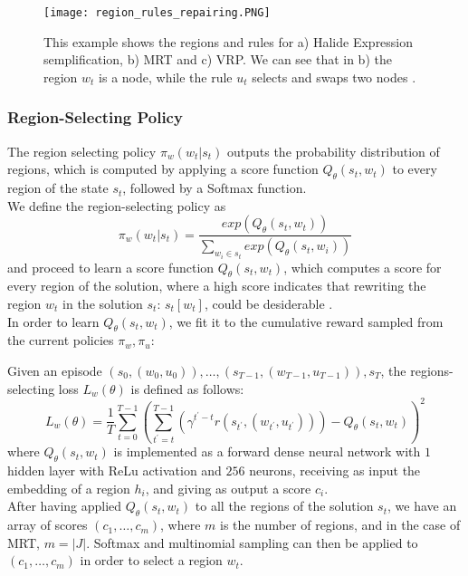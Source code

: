 \documentclass[12pt]{article}
\begin{document}
\begin{figure}[H]
    \centering
    \texttt{[image: region\_rules\_repairing.PNG]}
    \caption{This example shows the regions and rules for a) Halide Expression semplification, b) MRT and c) VRP. We can see that in b) the region $w_t$ is a node, while the rule $u_t$ selects and swaps two nodes \cite{neu_rewriter}.}
    \label{img:region_rules_repairing}
\end{figure}

\subsubsection{Region-Selecting Policy}
\label{sec:region_selecting}
The region selecting policy $\pi_{w}(w_t|s_t)$ outputs the probability distribution of regions, which is computed by applying a score function $Q_{\theta}(s_t,w_t)$ to every region of the state $s_t$, followed by a Softmax function.\\
We define the region-selecting policy as $$\pi_{w}(w_t|s_t) = \frac{exp(Q_{\theta}(s_t,w_t))}{\sum_{w_i \in s_t}exp(Q_{\theta}(s_t, w_i))}$$ and proceed to learn a score function $Q_{\theta}(s_t, w_t)$, which computes a score for every region of the solution, where a high score indicates that rewriting the region $w_t$ in the solution $s_t$: $s_t[w_t]$, could be desiderable \cite{neu_rewriter}.\\
In order to learn $Q_{\theta}(s_t, w_t)$, we fit it to the cumulative reward sampled from the current policies $\pi_w, \pi_u$:

\medbreak
Given an episode $\left(s_0,(w_0,u_0)\right),\dots, \left(s_{T-1},(w_{T-1},u_{T-1})\right), s_T$, the regions-selecting loss $L_w(\theta)$ is defined as follows:
\label{region_selecting_loss}
$$L_w(\theta) = \frac{1}{T}\sum_{t=0}^{T-1}\left(\sum_{t^{'}=t}^{T-1}\left(\gamma^{t^{'}-t}r(s_{t^{'}},(w_{t^{'}},u_{t^{'}}))\right) - Q_{\theta}(s_t,w_t)\right)^2$$
where $Q_{\theta}(s_t, w_t)$ is implemented as a forward dense neural network with $1$ hidden layer with ReLu activation and $256$ neurons, receiving as input the embedding of a region $h_i$, and giving as output a score $c_i$.\\
After having applied $Q_{\theta}(s_t, w_t)$ to all the regions of the solution $s_t$, we have an array of scores $(c_1,\dots,c_m)$, where $m$ is the number of regions, and in the case of MRT, $m=|J|$. Softmax and multinomial sampling can then be applied to 
$(c_1,\dots,c_m)$ in order to select a region $w_t$.
\end{document}
